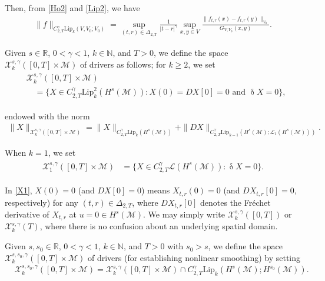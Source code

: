 \documentclass[letterpaper, 11pt,  reqno]{amsart}
\newcommand{\1}{\hspace{0.5mm}\textup{I}\hspace{0.5mm}}
\newcommand{\noi}{\noindent}
\newcommand{\R}{\mathbb{R}}
\renewcommand{\L}{\mathcal{L}}
\newcommand{\updl}{\updelta}
\newcommand{\Dl}{\Delta}
\newcommand{\g}{\gamma}
\newcommand{\M}{\mathcal{M}}
\newcommand{\N}{\mathbb{N}}
\newcommand{\cL}{\mathcal{L}}
\newcommand{\cX}{\mathcal{X}}
\newcommand{\Lip}{\mathrm{Lip}}
\numberwithin{equation}{section}
\numberwithin{theorem}{section}
\begin{document}
\noi
Then, 
from \eqref{Ho2} and \eqref{Lip2}, we have 
\begin{align*}
\|f \|_{C^\g_{2, T}\Lip_k(V, V_0; V_0)}
= \sup_{(t,r) \in \Dl_{2,T}}
\frac 1{|t-r|^{\g}}
\sup_{x,y\in V} 
\frac{\| f_{t, r}(x)- f_{t, r}(y)\|_{V_0}}{
G_{V, V_0}(x, y)}.
\end{align*}









\medskip

Given $s \in \R$, $0 < \g < 1$,  $k \in \N$, and $T > 0$, 
we define the space 
$\cX^{s, \g}_k([0, T]\times\M)$ of drivers 
as follows; for $k \ge 2$, we set
\begin{align}
\begin{split}
& \cX^{s, \g}_k ([0, T]\times \M) \\
& \quad = 
\big\{X \in C^\g_{2, T} \Lip_k^2(H^s(\M)):
X(0) = DX[0]= 0 \text{ and }\updl X = 0\big\}, 
\end{split}
\label{X1}
\end{align}


\noi
endowed with the norm
\begin{align}
\|X\|_{\cX^{s, \g}_k([0, T]\times \M)} 
=  \|X\|_{C^\g_{2, T}\Lip_k(H^s(\M))} + \|DX\|_{C^\g_{2, T}\Lip_{k-1}(H^s(\M);\cL_1(H^s(\M)))}.
\label{X2}
\end{align}

\noi
When $k = 1$, we set
\begin{align}
\begin{split}
 \cX^{s, \g}_1 ([0, T]\times \M) 
& =  \big\{ X \in 
C^\g_{2, T} \L(H^s(\M)):
\updl X = 0\big\}.
\end{split}
\label{X1z}
\end{align}


\noi
In \eqref{X1}, 
 $X(0) = 0$ (and $DX[0]= 0$) means $X_{t, r}(0) = 0$ 
(and $DX_{t, r}[0]= 0$, respectively)
for any $(t, r) \in \Dl_{2, T}$, 
where $DX_{t, r}[0]$
denotes the Fr\'echet derivative of $X_{t, r}$ at $u = 0 \in H^s(\M)$.
We may simply write $\cX^{s, \g}_k ([0, T])$ or $\cX^{s, \g}_k(T)$, 
where there is no confusion about 
an underlying spatial domain.



Given $s, s_0 \in \R$, $0 < \g < 1$,  $ k \in \N$, and $T > 0$
with $s_0 > s$, we define the space
$\cX^{s, s_0, \g}_{k}([0, T]\times\M)$ 
of drivers (for establishing nonlinear smoothing) by 
setting 
\begin{align}
& \cX^{s, s_0, \g}_k ([0, T]\times \M) 
= \cX^{s, \g}_k ([0, T]\times \M) \cap C^\g_{2, T} \Lip_k(H^s(\M); H^{s_0}(\M)).
\label{X1x}
\end{align}
\end{document}
